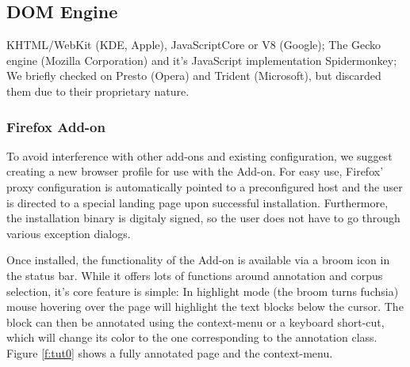 \subsection{DOM Engine}

KHTML/WebKit (KDE, Apple), JavaScriptCore or V8 (Google);
The Gecko engine (Mozilla Corporation) and it's JavaScript implementation Spidermonkey;
We briefly checked on Presto (Opera) and Trident (Microsoft), but discarded them due to their proprietary nature.

\subsubsection{Firefox Add-on}

To avoid interference with other add-ons and existing configuration, we suggest creating a new browser profile for use with the Add-on.
For easy use, Firefox' proxy configuration is automatically pointed to a preconfigured host and the user is directed to a special landing page upon successful installation.
Furthermore, the installation binary is digitaly signed, so the user does not have to go through various exception dialogs.


Once installed, the functionality of the Add-on is available via a broom icon in the status bar.
While it offers lots of functions around annotation and corpus selection, it's core feature is simple:
In highlight mode (the broom turns fuchsia) mouse hovering over the page will highlight the text blocks below the cursor.
The block can then be annotated using the context-menu or a keyboard short-cut, which will change its color to the one corresponding to the annotation class.
Figure \ref{f:tut0} shows a fully annotated page and the context-menu.

